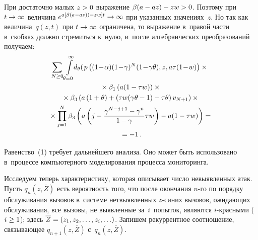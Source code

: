 \begin{multicols}{2}
  При достаточно малых $z\hm>0$ выражение $\beta(a\hm- az)\hm-zw\hm>0$. 
Поэтому при $t\hm\to \infty$ величина $e^{a[\beta(a-az))-zw]t} \hm\to\infty$ при 
указанных значениях~$z$. Но так как величина~$q(z,t)$ при $t\hm\to\infty$ 
ограничена, то выражение в~правой части в~скобках должно стремиться к~нулю, и~после алгебраических преобразований получаем:
  \begin{multline}
 \hspace*{-2.56012pt} \sum\limits_{N\geq0} 
 \int\limits^\infty_{\theta=0}\hspace*{-1mm}
   d_\theta \!\left(\! \right.
  p\left( (1\!-\!\alpha) (1\!-\!\gamma)^N (1\!-\!\gamma\theta), z, 
  a\tau(1\!-\!w)\right)\times{}\\
{}\times
\beta_1\left(a(1-\tau w)\right)\times{}\\
{}\times \beta_3\left( a\left(1+\theta\right)+\left(\tau 
w(\gamma\theta-1)-\tau\theta\right) v_{N+1}\right) \times{}\\
{}\times
  \prod^N_{j=1}\beta_3 \left(a\left( 
  j-\fr{\gamma^{N-j+1}-\gamma^n}{1-\gamma}\tau w\right)-a(1-\tau w)\right)={}\\
  {}=-1\,.
  \label{e1-sim}
  \end{multline}
  
  Равенство~(1) требует дальнейшего анализа. Оно может быть использовано 
в~процессе компьютерного моделирования процесса мониторинга.
  
  Исследуем теперь характеристику, которая описывает число невыявленных 
атак. Пусть $q_n(z,\overline{Z})$ есть вероятность того, что после окончания 
\mbox{$n$-го} по порядку обслуживания вызовов в~системе нет\linebreak выявленных  
$z$-си\-них вызовов, ожидающих обслуживания, все вызовы, не выявленные 
за~$i$~попыток, являются $i$-крас\-ны\-ми ($i\hm\geq 1$); здесь 
$\overline{Z}\hm= (z_1, z_2, \ldots , z_i, \ldots)$. Запишем рекуррентное 
\mbox{соотношение}, связывающее $q_{n+1}(z,\overline{Z})$ с~$q_n(z,\overline{Z})$.
  

\end{multicols}

